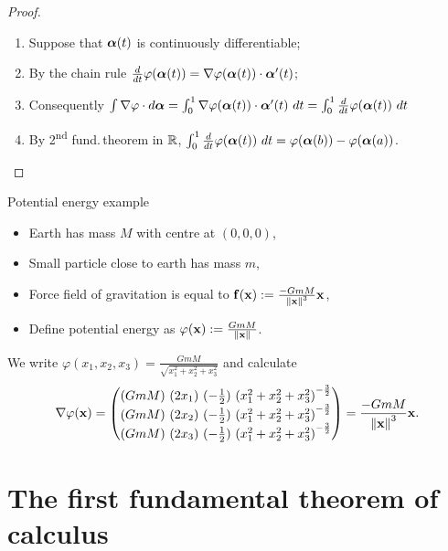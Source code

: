 \begin{proof}
    \begin{enumerate}
        \item Suppose that \(\boldsymbol{\alpha}(t)\) is continuously differentiable;
        \item By the chain rule \(\frac{d}{dt} \varphi(\boldsymbol{\alpha}(t)) = \nabla \varphi(\boldsymbol{\alpha}(t))\cdot \boldsymbol{\alpha}'(t)\);
        \item Consequently \(\int \nabla \varphi \cdot d\aalpha
              = \int_0^1 \nabla \varphi(\aalpha(t)) \cdot \aalpha'(t)\ dt
              = \int_0^1 \tfrac{d}{dt} \varphi(\aalpha(t)) \ dt \)
        \item By 2\textsuperscript{nd} fund.\,theorem in \(\mathbb{R}\),
              \(\int_0^1 \tfrac{d}{dt} \varphi(\boldsymbol{\alpha}(t)) \ dt = \varphi(\boldsymbol{\alpha}(b)) - \varphi(\boldsymbol{\alpha}(a))\).
    \end{enumerate}
\end{proof}




{Potential energy example}

\begin{itemize}
    \item Earth has mass \(M\) with centre at \((0,0,0)\),
    \item Small particle close to earth has mass \(m\),
    \item Force field of gravitation is equal to
          \(\mathbf{f}(\mathbf{x}) := \frac{-GmM}{\left\|\mathbf{x}\right\|^3}\mathbf{x}\),
    \item Define potential energy as
          \(\varphi(\mathbf{x}):= \frac{GmM}{\left\|\mathbf{x}\right\|}\).
\end{itemize}

We write \(\varphi(x_1,x_2,x_3) = \frac{GmM}{\sqrt{x_1^2 + x_2^2 + x_3^2}}\)
and calculate
\[
    \nabla \varphi(\mathbf{x}) =
    \begin{pmatrix}
        {(GmM) \ (2x_1)} \ {(-\frac{1}{2}) \ {(x_1^2 + x_2^2 + x_3^2)}^{-\frac{3}{2}}} \\
        {(GmM) \ (2x_2)} \ {(-\frac{1}{2}) \ {(x_1^2 + x_2^2 + x_3^2)}^{-\frac{3}{2}}} \\
        {(GmM) \ (2x_3)} \ {(-\frac{1}{2}) \ {(x_1^2 + x_2^2 + x_3^2)}^{-\frac{3}{2}}}
    \end{pmatrix}
    =   \frac{-GmM}{\left\|\mathbf{x}\right\|^3}\mathbf{x}.
\]




\section{The first fundamental theorem of calculus}


